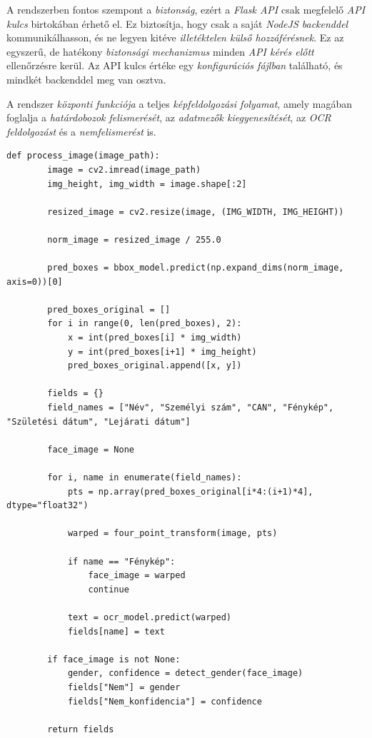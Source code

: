 \documentclass[
]{thesis-ekf}
\theoremstyle{definition}
\theoremstyle{remark}
\begin{document}
A rendszerben fontos szempont a \emph{biztonság}, ezért a \emph{Flask API} csak megfelelő \emph{API kulcs} birtokában érhető el. Ez biztosítja, hogy csak a saját \emph{NodeJS backenddel} kommunikálhasson, és ne legyen kitéve \emph{illetéktelen külső hozzáférésnek}. Ez az egyszerű, de hatékony \emph{biztonsági mechanizmus} minden \emph{API kérés előtt} ellenőrzésre kerül. Az API kulcs értéke egy \emph{konfigurációs fájlban} található, és mindkét backenddel meg van osztva.

A rendszer \emph{központi funkciója} a teljes \emph{képfeldolgozási folyamat}, amely magában foglalja a \emph{határdobozok felismerését}, az \emph{adatmezők kiegyenesítését}, az \emph{OCR feldolgozást} és a \emph{nemfelismerést} is.

\begin{lstlisting}[style=mypython, caption={Képfeldolgozási folyamat}, label=kod-python9]
	def process_image(image_path):
		image = cv2.imread(image_path)
		img_height, img_width = image.shape[:2]
		
		resized_image = cv2.resize(image, (IMG_WIDTH, IMG_HEIGHT))
		
		norm_image = resized_image / 255.0
		
		pred_boxes = bbox_model.predict(np.expand_dims(norm_image, axis=0))[0]
		
		pred_boxes_original = []
		for i in range(0, len(pred_boxes), 2):
			x = int(pred_boxes[i] * img_width)
			y = int(pred_boxes[i+1] * img_height)
			pred_boxes_original.append([x, y])
		
		fields = {}
		field_names = ["Név", "Személyi szám", "CAN", "Fénykép", "Születési dátum", "Lejárati dátum"]
		
		face_image = None
		
		for i, name in enumerate(field_names):
			pts = np.array(pred_boxes_original[i*4:(i+1)*4], dtype="float32")
		
			warped = four_point_transform(image, pts)
		
			if name == "Fénykép":
				face_image = warped
				continue
		
			text = ocr_model.predict(warped)
			fields[name] = text
		
		if face_image is not None:
			gender, confidence = detect_gender(face_image)
			fields["Nem"] = gender
			fields["Nem_konfidencia"] = confidence
		
		return fields
\end{lstlisting}
\end{document}
